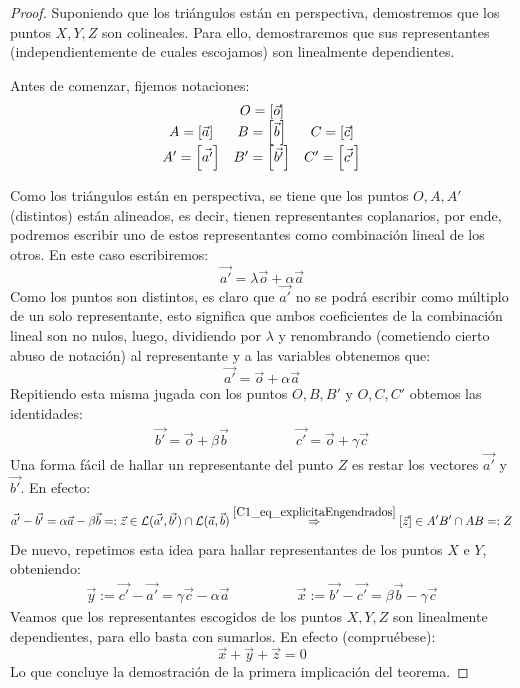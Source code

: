 \begin{proof}
	Suponiendo que los triángulos están en perspectiva, demostremos que los puntos $X,Y,Z$ son colineales. Para ello, demostraremos que sus representantes (independientemente de cuales escojamos) son linealmente dependientes.
	
	Antes de comenzar, fijemos notaciones:
	\[\begin{array}{ccc}
	& O=\left [ \vec{o} \right ] & \\
	A=\left [ \vec{a} \right ]   & B=\left [ \vec{b} \right ]   & C=\left [ \vec{c} \right ]\\
	A'=\left [ \vec{a'} \right ] & B'=\left [ \vec{b'} \right ] & C'=\left [ \vec{c'} \right ] 
	\end{array}\]
	
	Como los triángulos están en perspectiva, se tiene que los puntos $O,A,A'$ (distintos) están alineados, es decir, tienen representantes coplanarios, por ende, podremos escribir uno de estos representantes como combinación lineal de los otros. En este caso escribiremos:
	\[\vec{a'}=\lambda \vec{o}+\alpha\vec{a}\]
	Como los puntos son distintos, es claro que $\vec{a'}$ no se podrá escribir como múltiplo de un solo representante, esto significa que ambos coeficientes de la combinación lineal son no nulos, luego, dividiendo por $\lambda$ y renombrando (cometiendo cierto abuso de notación) al representante y a las variables obtenemos que:
	\[\vec{a'}=\vec{o}+\alpha\vec{a}\]
	Repitiendo esta misma jugada con los puntos $O,B,B'$ y $O,C,C'$ obtemos las identidades:
	\[\begin{array}{lr}
	\vec{b'}=\vec{o}+\beta\vec{b} \qquad&\qquad
	\vec{c'}=\vec{o}+\gamma\vec{c}
	\end{array}\]
	Una forma fácil de hallar un representante del punto $Z$ es restar los vectores $\vec{a'}$ y $\vec{b'}$. En efecto:
	\[\vec{a'}-\vec{b'}=\alpha\vec{a}-\beta\vec{b}=:\vec{z}\in\mathcal{L}(\vec{a'},\vec{b'})\cap\mathcal{L}(\vec{a},\vec{b})\stackrel{\eqref{C1_eq_explicitaEngendrados}}{\Rightarrow}\left [ \vec{z} \right ]\in A'B'\cap AB=:Z\]
	De nuevo, repetimos esta idea para hallar representantes de los puntos $X$ e $Y$, obteniendo:
	\[\begin{array}{lr}
	\vec{y}:=\vec{c'}-\vec{a'}=\gamma\vec{c}-\alpha\vec{a}\qquad&
	\qquad \vec{x}:=\vec{b'}-\vec{c'}=\beta\vec{b}-\gamma\vec{c}
	\end{array}\]
	Veamos que los representantes escogidos de los puntos $X,Y,Z$ son linealmente dependientes, para ello basta con sumarlos. En efecto (compruébese):
	\[\vec{x}+\vec{y}+\vec{z}=0\]
	Lo que concluye la demostración de la primera implicación del teorema.
	

\end{proof}
